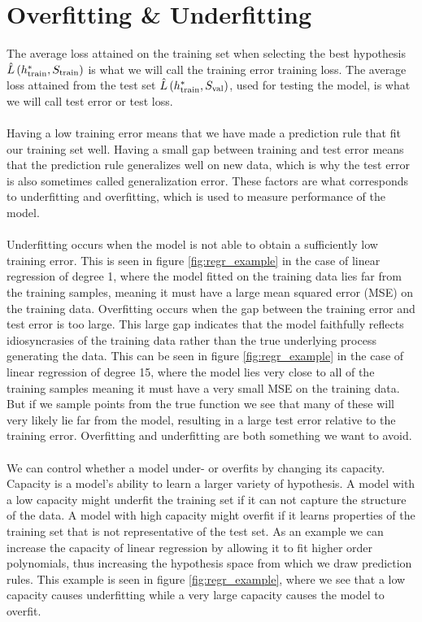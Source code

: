 \section{Overfitting \& Underfitting}
The average loss attained on the training set when selecting the best hypothesis $\hat{L}\left (h^*_\text{train}, S_\text{train}\right)$ is what we will call the training error training loss. The average loss attained from the test set $\hat{L}\left (h^*_\text{train}, S_\text{val}\right)$, used for testing the model, is what we will call test error or test loss.\\
\\
Having a low training error means that we have made a prediction rule that fit our training set well. Having a small gap between training and test error means that the prediction rule generalizes well on new data, which is why the test error is also sometimes called generalization error. These factors are what corresponds to underfitting and overfitting, which is used to measure performance of the model.\\
\\
Underfitting occurs when the model is not able to obtain a sufficiently low training error. This is seen in figure \ref{fig:regr_example} in the case of linear regression of degree 1, where the model fitted on the training data lies far from the training samples, meaning it must have a large mean squared error (MSE) on the training data. Overfitting occurs when the gap between the training error and test error is too large. This large gap indicates that the model faithfully reflects idiosyncrasies of the training data rather than the true underlying process generating the data. This can be seen in figure \ref{fig:regr_example} in the case of linear regression of degree 15, where the model lies very close to all of the training samples meaning it must have a very small MSE on the training data. But if we sample points from the true function we see that many of these will very likely lie far from the model, resulting in a large test error relative to the training error. Overfitting and underfitting are both something we want to avoid. \\
\\
We can control whether a model under- or overfits by changing its capacity. Capacity is a model's ability to learn a larger variety of hypothesis. A model with a low capacity might underfit the training set if it can not capture the structure of the data. A model with high capacity might overfit if it learns properties of the training set that is not representative of the test set. As an example we can increase the capacity of linear regression by allowing it to fit higher order polynomials, thus increasing the hypothesis space from which we draw prediction rules. This example is seen in figure \ref{fig:regr_example}, where we see that a low capacity causes underfitting while a very large capacity causes the model to overfit.

